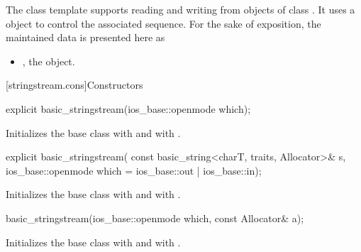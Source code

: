 \pnum
The
class template
supports reading and writing from objects of class
.
It uses a
object to control the associated sequence.
For the sake of exposition, the maintained data is presented here as
\begin{itemize}
\item
{}, the  object.
\end{itemize}

[stringstream.cons]{Constructors}

%
\begin{itemdecl}
explicit basic_stringstream(ios_base::openmode which);
\end{itemdecl}

\begin{itemdescr}
\pnum
\effects
Initializes the base class with
and
with
.
\end{itemdescr}

%
\begin{itemdecl}
explicit basic_stringstream(
  const basic_string<charT, traits, Allocator>& s,
  ios_base::openmode which = ios_base::out | ios_base::in);
\end{itemdecl}

\begin{itemdescr}
\pnum
\effects
Initializes the base class with
and
with
.
\end{itemdescr}

%
\begin{itemdecl}
basic_stringstream(ios_base::openmode which, const Allocator& a);
\end{itemdecl}

\begin{itemdescr}
\pnum
\effects
Initializes the base class with
and  with
.
\end{itemdescr}

